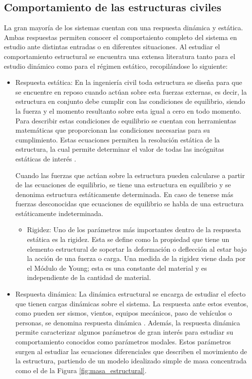 \subsection{Comportamiento de las estructuras civiles}

La gran mayoría de los sistemas cuentan con una respuesta dinámica y estática. Ambas respuestas permiten conocer el comportaiento completo del sistema en estudio ante distintas entradas o en diferentes situaciones. Al estudiar el comportamiento estructural se encuentra una extensa literatura tanto para el estudio dinámico como para el régimen estático, recopilándose lo siguiente:

\begin{itemize}
    \item{Respuesta estática}: En la ingeniería civil toda estructura se diseña para que se encuentre en reposo cuando actúan sobre esta fuerzas externas, es decir, la estructura en conjunto debe cumplir con las condiciones de equilibrio, siendo la fuerza y el momento resultanto sobre esta igual a cero en todo momento. Para describir estas condiciones de equilibrio se cuentan con herramientas matemáticas que proporcionan las condiciones necesarias para su cumplimiento. Estas ecuaciones permiten la resolución estática de la estructura, la cual permite determinar el valor de todas las incógnitas estáticas de interés \citep{basset2014analisis}.
    
    \indent Cuando las fuerzas que actúan sobre la estructura pueden calcularse a partir de las ecuaciones de equilibrio, se tiene una estructura en equilibrio y se denonima estructura estáticamente determinada. En caso de tenerse más fuerzas desconocidas que ecuaciones de equilibrio se habla de una estructura estáticamente indeterminada.

        \begin{itemize}
            \item Rigidez: Uno de los parámetros más importantes dentro de la respuesta estática es la rigidez. Esta se define como la propiedad que tiene un elemento estructural de soportar la deformación o deflección al estar bajo la acción de una fuerza o carga. Una medida de la rigidez viene dada por el Módulo de Young; esta es una constante del material y es independiente de la cantidad de material.
        \end{itemize}

    \item{Respuesta dinámica}: La dinámica estructural se encarga de estudiar el efecto que tienen cargas dinámicas sobre el sistema. La respuesta ante estos eventos, como pueden ser sismos, vientos, equipos mecánicos, paso de vehículos o personas, se denomina respuesta dinámica \citep{hurtado2000}. Además, la respuesta dinámica permite caracterizar algunos parámetros de gran interés para estudiar su comportamiento conocidos como parámetros modales. Estos parámetros surgen al estudiar las ecuaciones diferenciales que describen el movimiento de la estructura, partiendo de un modelo idealizado simple de masa concentrada como el de la Figura \ref{fig:masa_estructural}.
    

\end{itemize}
